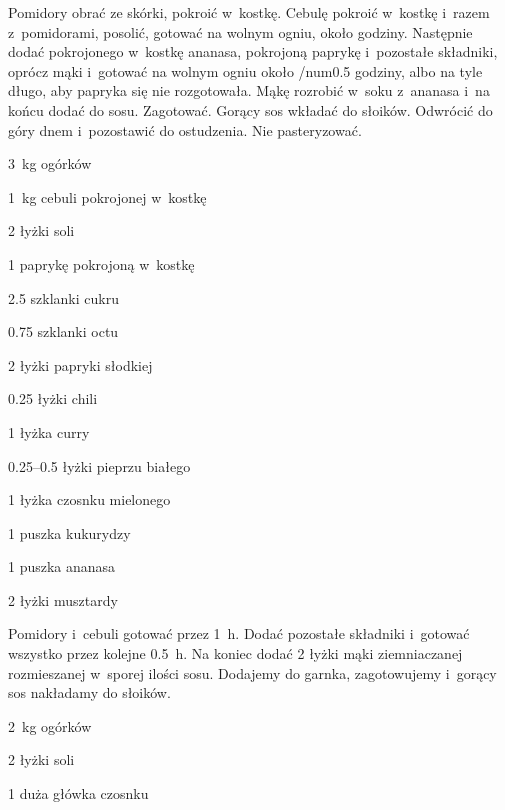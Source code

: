 \documentclass[../kucharek.tex]{subfiles}
\begin{document}
Pomidory obrać ze skórki, pokroić w~kostkę. Cebulę pokroić w~kostkę i~razem
z~pomidorami, posolić, gotować na wolnym ogniu, około godziny. Następnie dodać
pokrojonego w~kostkę ananasa, pokrojoną paprykę i~pozostałe składniki, oprócz
mąki i~gotować na wolnym ogniu około /num{0.5} godziny, albo na tyle długo, aby
papryka się nie rozgotowała. Mąkę rozrobić w~soku z~ananasa i~na końcu dodać do
sosu. Zagotować. Gorący sos wkładać do słoików. Odwrócić do góry dnem
i~pozostawić do ostudzenia. Nie pasteryzować.


\begin{Ingred}
    \item \qty{3}{\kilo\gram} ogórków
    \item \qty{1}{\kilo\gram} cebuli pokrojonej w~kostkę
    \item \num{2} łyżki soli
    \item \num{1} paprykę pokrojoną w~kostkę
    \item \num{2.5} szklanki cukru
    \item \num{0.75} szklanki octu
    \item \num{2} łyżki papryki słodkiej
    \item \num{0.25} łyżki chili
    \item \num{1} łyżka curry
    \item \numrange{0.25}{0.5} łyżki pieprzu białego
    \item \num{1} łyżka czosnku mielonego
    \item \num{1} puszka kukurydzy
    \item \num{1} puszka ananasa
    \item \num{2} łyżki musztardy
\end{Ingred}

Pomidory i~cebuli gotować przez \qty{1}{\hour}. Dodać pozostałe składniki
i~gotować wszystko przez kolejne \qty{0.5}{\hour}. Na koniec dodać \num{2}
łyżki mąki ziemniaczanej rozmieszanej w~sporej ilości sosu. Dodajemy do garnka,
zagotowujemy i~gorący sos nakładamy do słoików.


\begin{Ingred}
    \item \qty{2}{\kilo\gram} ogórków
    \item \num{2} łyżki soli
    \item \num{1} duża główka czosnku
\end{Ingred}
\end{document}

